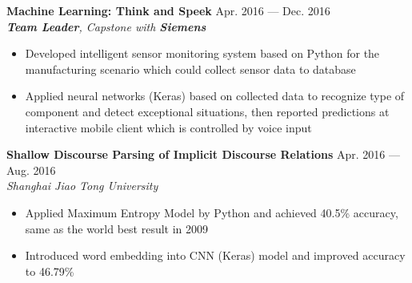 \documentclass[margin,line,10pt]{res}
\begin{document}
\begin{resume}
{
\small
{\bf Machine Learning: Think and Speek} \hfill Apr. 2016 --- Dec. 2016\\
{\it \textbf{Team Leader}, Capstone with {\bf Siemens}}
}
\begin{itemize}
\setlength{\itemsep}{0pt}
\setlength{\parskip}{0pt}
\setlength{\parsep}{0pt}
\item {\small Developed intelligent sensor monitoring system based on Python for the manufacturing scenario which could collect sensor data to database}
\item {\small Applied neural networks (Keras) based on collected data to recognize type of component and detect exceptional situations, then reported predictions at interactive mobile client which is controlled by voice input}
\end{itemize}
\vspace{-.1 in}
{
\small
{\bf Shallow Discourse Parsing of Implicit Discourse Relations} \hfill Apr. 2016 ---  Aug. 2016\\
{\it Shanghai Jiao Tong University}
}
\begin{itemize}
\setlength{\itemsep}{0pt}
\setlength{\parskip}{0pt}
\setlength{\parsep}{0pt}
\item {\small Applied Maximum Entropy Model by Python and achieved 40.5\% accuracy, same as the world best result in 2009}
\item {\small Introduced word embedding into CNN (Keras) model and improved accuracy to 46.79\%}
\end{itemize}
\vspace{-.1 in}


\end{resume}
\end{document}
